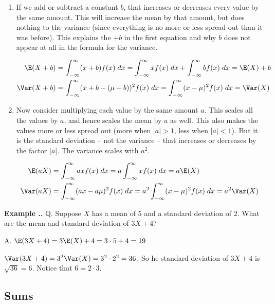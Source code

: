 \documentclass[twoside]{book}\usepackage[]{graphicx}\usepackage[]{xcolor}
\def\question{{\sf Q. }}
\def\answer{{\sf A. }}
\newcounter{example}[section]
\newenvironment{example}%
{\refstepcounter{example}%
\textbf{Example \thesection.\arabic{example}. }}%
{}
\begin{document}
\begin{enumerate}
	\item
		If we add or subtract a constant $b$, that increases or decreases every
		value by the same amount.  This will increase the mean by that amount,
		but does nothing to the variance (since everything is no more or less
		spread out than it was before).  This explains the $+b$ in the first
		equation and why $b$ does not appear at all in the formula for the
		variance.

		\begin{align*}
		\E(X + b) &= \int_{-\infty}^{\infty} (x+b) f(x) \; dx  
		      = \int_{-\infty}^{\infty} x f(x) \; dx  
		      	+ \int_{-\infty}^{\infty} b f(x) \; dx  
			  = \E(X) + b
			  \\
		\Var(X+b) &= \int_{-\infty}^{\infty} (x + b - (\mu + b))^2 f(x) \; dx  
					= \int_{-\infty}^{\infty} (x - \mu)^2 f(x) \; dx  = \Var(X) 
		\end{align*}
	\item
		Now consider multiplying each value by the same amount $a$.  
		This scales all the values by $a$, and hence scales the mean by $a$ as well.
		This also makes the values more or less spread out (more when $|a| > 1$, less when
		$|a| < 1$).  
		But it is the standard deviation -- not the 
		variance -- that increases or decreases by the factor $|a|$.
		The variance scales with $a^2$.

		\begin{align*}
		\E(aX) &= \int_{-\infty}^{\infty} ax f(x) \; dx  
		      = a \int_{-\infty}^{\infty} x f(x) \; dx = a \E(X)
			  \\
		\Var(aX) &= \int_{-\infty}^{\infty} (ax - a\mu)^2 f(x) \; dx  
		      = a^2 \int_{-\infty}^{\infty} (x-\mu)^2 f(x) \; dx = a^2 \Var(X)
		\end{align*}
\end{enumerate}

\begin{example}
	\question
	Suppose $X$ has a mean of 5 and a standard deviation of 2.  What are the mean
	and standard deviation of $3 X + 4$?

	\answer
	$\E(3 X + 4) = 3 \E(X) + 4 = 3 \cdot 5 + 4 = 19$

	$\Var(3 X + 4) = 3^2 \Var(X) = 3^2 \cdot 2^2 = 36$.  So he standard deviation of 
	$3X + 4$ is $\sqrt{36} = 6$.  Notice that $6 = 2 \cdot 3$.
\end{example}

\subsection{Sums}
\end{document}
